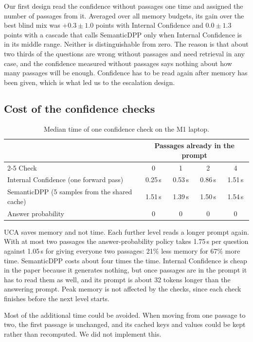\documentclass[11pt,a4paper]{article}
\begin{document}
Our first design read the confidence without passages one time and assigned the
number of passages from it. Averaged over all memory budgets, its gain over the
best blind mix was $+0.3 \pm 1.0$ points with Internal Confidence and
$0.0 \pm 1.3$ points with a cascade that calls SemanticDPP only when Internal
Confidence is in its middle range. Neither is distinguishable from zero. The
reason is that about two thirds of the questions are wrong without passages and
need retrieval in any case, and the confidence measured without passages says
nothing about how many passages will be enough. Confidence has to be read again
after memory has been given, which is what led us to the escalation design.

\subsection{Cost of the confidence checks}

\begin{table}[H]
\centering
\small
\begin{tabular}{@{}lcccc@{}}
\toprule
 & \multicolumn{4}{c}{Passages already in the prompt} \\
\cmidrule(l){2-5}
Check & 0 & 1 & 2 & 4 \\
\midrule
Internal Confidence (one forward pass) & 0.25\,s & 0.53\,s & 0.86\,s & 1.51\,s \\
SemanticDPP (5 samples from the shared cache) & 1.51\,s & 1.39\,s & 1.50\,s & 1.54\,s \\
Answer probability & 0 & 0 & 0 & 0 \\
\bottomrule
\end{tabular}
\caption{Median time of one confidence check on the M1 laptop.}
\label{tab:time}
\end{table}

UCA saves memory and not time. Each further level reads a longer prompt again.
With at most two passages the answer-probability policy takes 1.75\,s per
question against 1.05\,s for giving everyone two passages: 21\% less memory for
67\% more time. SemanticDPP costs about four times the time. Internal
Confidence is cheap in the paper because it generates nothing, but once
passages are in the prompt it has to read them as well, and its prompt is about
32 tokens longer than the answering prompt. Peak memory is not affected by the
checks, since each check finishes before the next level starts.

Most of the additional time could be avoided. When moving from one passage to
two, the first passage is unchanged, and its cached keys and values could be
kept rather than recomputed. We did not implement this.
\end{document}
